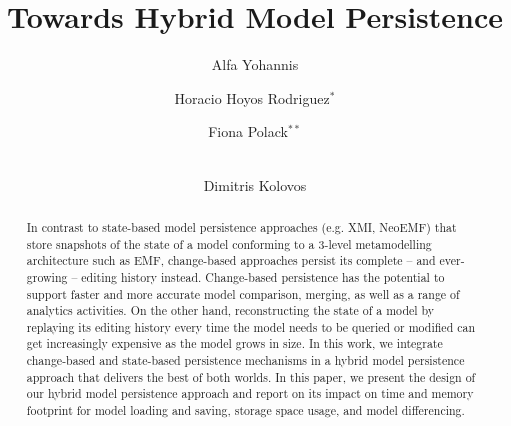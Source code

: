 \documentclass{llncs}
\begin{document}
\renewcommand{\thelstlisting}{\arabic{lstlisting}}
\renewcommand{\labelitemi}{$\bullet$}
\newcommand{\dk}[1]{\textbf{[DK: #1]}}

\title{Towards Hybrid Model Persistence}
%
%
\author{
Alfa Yohannis \and Horacio Hoyos Rodriguez$^{*}$ \and Fiona Polack$^{**}$ \and \\ Dimitris Kolovos
}
%
%


\maketitle      %
\begin{abstract}
In contrast to state-based model persistence approaches (e.g. XMI, NeoEMF) that store snapshots of the state of a model conforming to a 3-level metamodelling architecture such as EMF, change-based approaches persist its complete -- and ever-growing -- editing history instead. Change-based persistence has the potential to support faster and more accurate model comparison, merging, as well as a range of analytics activities. On the other hand, reconstructing the state of a model by replaying its editing history every time the model needs to be queried or modified can get increasingly expensive as the model grows in size. In this work, we integrate change-based and state-based persistence mechanisms in a hybrid model persistence approach that delivers the best of both worlds. In this paper, we present the design of our hybrid model persistence approach and report on its impact on time and memory footprint for model loading and saving, storage space usage, and model differencing.
\end{abstract}
\end{document}

